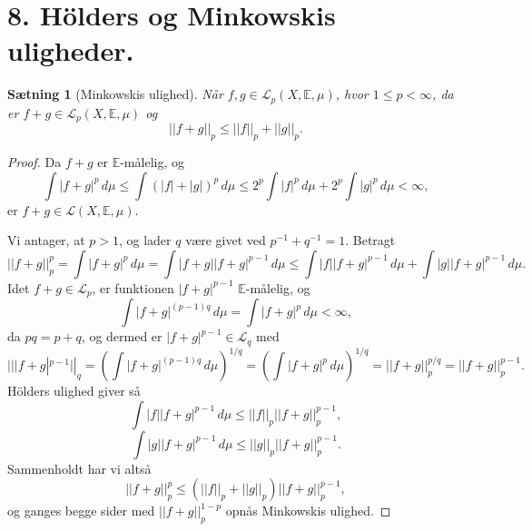 \documentclass[12pt]{report}
\newtheorem{theorem}[lemma]{Sætning}
\theoremstyle{break}
\newtheorem*{proof}{Bevis}
\theoremstyle{break}
\newcommand{\Int}[1]{\int#1\,d\mu}
\newcommand{\EE}{\mathbb{E}}
\renewcommand{\L}{\mathcal{L}}
\newcommand{\laengde}[1]{\lvert|#1\rvert|}
\begin{document}
\newpage
\section*{8. Hölders og Minkowskis uligheder.}
\begin{theorem}[Minkowskis ulighed]
Når $f,g\in\L_p(X,\EE,\mu)$, hvor $1\leq p<\infty$, da er $f+g\in\L_p(X,\EE,\mu)$ og \[\laengde{f+g}_p\leq\laengde{f}_p+\laengde{g}_p.\]
\end{theorem}
\begin{proof}
Da $f+g$ er $\EE$-målelig, og 
\[\Int{|f+g|^p}\leq\Int{(|f|+|g|)^p}\leq 2^p\Int{|f|^p}+2^p\Int{|g|^p}<\infty,\]
er $f+g\in\L(X,\EE,\mu)$.

\bigskip

Vi antager, at $p>1$, og lader $q$ være givet ved $p^{-1}+q^{-1}=1$. Betragt
\[\laengde{f+g}_p^p=\Int{|f+g|^p}=\Int{|f+g||f+g|^{p-1}}\leq\Int{|f||f+g|^{p-1}}+\Int{|g||f+g|^{p-1}}.\]
Idet $f+g\in\L_p$, er funktionen $|f+g|^{p-1}$  $\EE$-målelig, og 
\[\Int{|f+g|^{(p-1)q}}=\Int{|f+g|^p}<\infty,\]
da $pq = p+q$, og dermed er $|f+g|^{p-1}\in\L_q$ med
\[\laengde{|f+g|^{p-1}}_q=\left(\Int{|f+g|^{(p-1)q}}\right)^{1/q}=\left(\Int{|f+g|^p}\right)^{1/q} = \laengde{f+g}_p^{p/q}=\laengde{f+g}_p^{p-1}.\]
Hölders ulighed giver så
\[\Int{|f||f+g|^{p-1}}\leq\laengde{f}_p\laengde{f+g}_p^{p-1},\]
\[\Int{|g||f+g|^{p-1}}\leq\laengde{g}_p\laengde{f+g}_p^{p-1}.\]
Sammenholdt har vi altså
\[\laengde{f+g}_p^p\leq(\laengde{f}_p+\laengde{g}_p)\laengde{f+g}_p^{p-1},\]
og ganges begge sider med $\laengde{f+g}^{1-p}_p$ opnås Minkowskis ulighed.
\end{proof}


\newpage
\end{document}
